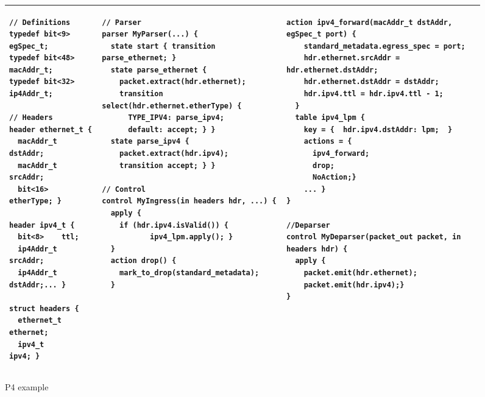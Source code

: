 \documentclass[sigconf]{acmart}
\begin{document}
\begin{figure}
\begin{tabular}{|p{3.3cm}|p{5.9cm}|p{7.7cm}|}
\hline
\begin{lstlisting}[language=P4]
// Definitions
typedef bit<9>  egSpec_t;
typedef bit<48> macAddr_t;
typedef bit<32> ip4Addr_t;

// Headers
header ethernet_t {
  macAddr_t dstAddr;
  macAddr_t srcAddr;
  bit<16>   etherType; }
    
header ipv4_t {
  bit<8>    ttl;
  ip4Addr_t srcAddr;
  ip4Addr_t dstAddr;... }
    
struct headers {
  ethernet_t   ethernet;
  ipv4_t       ipv4; }

\end{lstlisting}
&
\begin{lstlisting}[language=P4]
// Parser
parser MyParser(...) {
  state start { transition parse_ethernet; }
  state parse_ethernet {
    packet.extract(hdr.ethernet);
    transition select(hdr.ethernet.etherType) {
      TYPE_IPV4: parse_ipv4;
      default: accept; } }
  state parse_ipv4 {
    packet.extract(hdr.ipv4);
    transition accept; } }
    
// Control    
control MyIngress(in headers hdr, ...) {
  apply {
    if (hdr.ipv4.isValid()) {
           ipv4_lpm.apply(); }
  }         
  action drop() {
    mark_to_drop(standard_metadata);
  }    
\end{lstlisting}
&
\begin{lstlisting}[language=P4]
  action ipv4_forward(macAddr_t dstAddr, egSpec_t port) {
    standard_metadata.egress_spec = port;
    hdr.ethernet.srcAddr = hdr.ethernet.dstAddr;
    hdr.ethernet.dstAddr = dstAddr;
    hdr.ipv4.ttl = hdr.ipv4.ttl - 1;
  }    
  table ipv4_lpm {
    key = {  hdr.ipv4.dstAddr: lpm;  }
    actions = {
      ipv4_forward;
      drop;
      NoAction;}
    ... }   
}

//Deparser
control MyDeparser(packet_out packet, in headers hdr) {
  apply {
    packet.emit(hdr.ethernet);
    packet.emit(hdr.ipv4);}
}
\end{lstlisting}\\
\hline
\end{tabular}
\caption{P4 example}
  \label{code:P4}
\end{figure}



\end{document}
